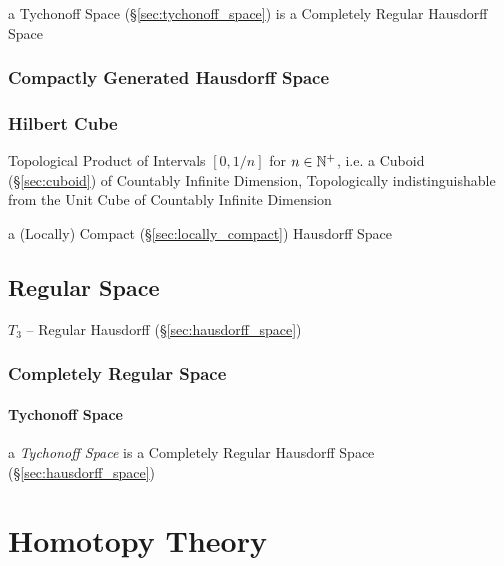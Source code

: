 a Tychonoff Space (\S\ref{sec:tychonoff_space}) is a Completely Regular
Hausdorff Space



\subsubsection{Compactly Generated Hausdorff Space}
\label{sec:compact_hausdorff}



\subsubsection{Hilbert Cube}\label{sec:hilbert_cube}

Topological Product of Intervals $[0, 1/n]$ for $n \in \mathbb{N}^+$, i.e. a Cuboid
(\S\ref{sec:cuboid}) of Countably Infinite Dimension, Topologically
indistinguishable from the Unit Cube of Countably Infinite Dimension

a (Locally) Compact (\S\ref{sec:locally_compact}) Hausdorff Space



\subsection{Regular Space}\label{sec:regular_space}

$\xspace{T}_3$ -- Regular Hausdorff (\S\ref{sec:hausdorff_space})



\subsubsection{Completely Regular Space}\label{sec:completely_regular_space}

\paragraph{Tychonoff Space}\label{sec:completely_regular_space}

a \emph{Tychonoff Space} is a Completely Regular Hausdorff Space
(\S\ref{sec:hausdorff_space})



\section{Homotopy Theory}\label{sec:homotopy_theory}

